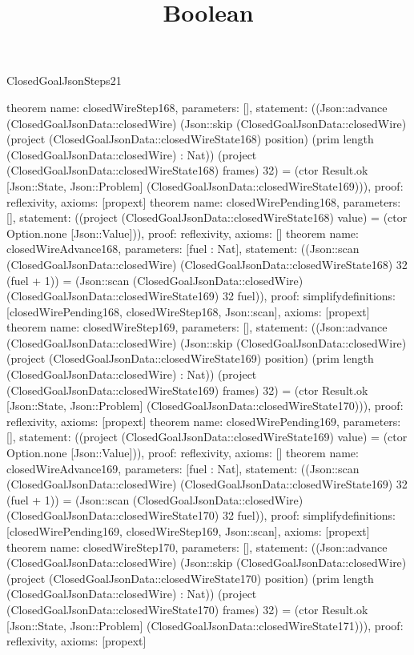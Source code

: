\begin{lexlean}{ClosedGoalJsonSteps21}
\title{Boolean}
\begin{semanticmodule}
theorem{
 name: closedWireStep168, parameters: [],
 statement: ((Json::advance (ClosedGoalJsonData::closedWire) (Json::skip (ClosedGoalJsonData::closedWire) (project (ClosedGoalJsonData::closedWireState168) position) (prim length (ClosedGoalJsonData::closedWire) : Nat)) (project (ClosedGoalJsonData::closedWireState168) frames) 32) = (ctor Result.ok [Json::State, Json::Problem] (ClosedGoalJsonData::closedWireState169))), proof: reflexivity{}, axioms: [propext]
}
theorem{
 name: closedWirePending168, parameters: [],
 statement: ((project (ClosedGoalJsonData::closedWireState168) value) = (ctor Option.none [Json::Value])), proof: reflexivity{}, axioms: []
}
theorem{
 name: closedWireAdvance168, parameters: [fuel : Nat],
 statement: ((Json::scan (ClosedGoalJsonData::closedWire) (ClosedGoalJsonData::closedWireState168) 32 (fuel + 1)) = (Json::scan (ClosedGoalJsonData::closedWire) (ClosedGoalJsonData::closedWireState169) 32 fuel)), proof: simplify{definitions: [closedWirePending168, closedWireStep168, Json::scan]}, axioms: [propext]
}
theorem{
 name: closedWireStep169, parameters: [],
 statement: ((Json::advance (ClosedGoalJsonData::closedWire) (Json::skip (ClosedGoalJsonData::closedWire) (project (ClosedGoalJsonData::closedWireState169) position) (prim length (ClosedGoalJsonData::closedWire) : Nat)) (project (ClosedGoalJsonData::closedWireState169) frames) 32) = (ctor Result.ok [Json::State, Json::Problem] (ClosedGoalJsonData::closedWireState170))), proof: reflexivity{}, axioms: [propext]
}
theorem{
 name: closedWirePending169, parameters: [],
 statement: ((project (ClosedGoalJsonData::closedWireState169) value) = (ctor Option.none [Json::Value])), proof: reflexivity{}, axioms: []
}
theorem{
 name: closedWireAdvance169, parameters: [fuel : Nat],
 statement: ((Json::scan (ClosedGoalJsonData::closedWire) (ClosedGoalJsonData::closedWireState169) 32 (fuel + 1)) = (Json::scan (ClosedGoalJsonData::closedWire) (ClosedGoalJsonData::closedWireState170) 32 fuel)), proof: simplify{definitions: [closedWirePending169, closedWireStep169, Json::scan]}, axioms: [propext]
}
theorem{
 name: closedWireStep170, parameters: [],
 statement: ((Json::advance (ClosedGoalJsonData::closedWire) (Json::skip (ClosedGoalJsonData::closedWire) (project (ClosedGoalJsonData::closedWireState170) position) (prim length (ClosedGoalJsonData::closedWire) : Nat)) (project (ClosedGoalJsonData::closedWireState170) frames) 32) = (ctor Result.ok [Json::State, Json::Problem] (ClosedGoalJsonData::closedWireState171))), proof: reflexivity{}, axioms: [propext]
}
\end{semanticmodule}
\end{lexlean}

